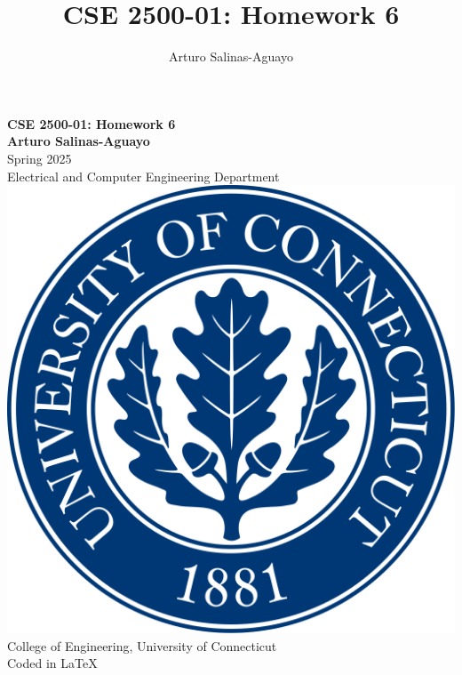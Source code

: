 \documentclass[12pt]{article}
\author{Arturo Salinas-Aguayo}
\title{CSE 2500-01: Homework 6}
\begin{document}
\newcommand{\closure}[2][3]{%
	{}\mkern#1mu\overline{\mkern-#1mu#2}}
\newcommand\ncoverline[1]{\mkern1mu\overline{\mkern-1mu#1\mkern-1mu}\mkern1mu}
\begin{titlepage}
	\centering
	\vspace*{3cm}
	\huge\textbf{CSE 2500-01: Homework 6}\\
	\vspace{5cm}
	\Large\textbf{Arturo Salinas-Aguayo}\\
	\normalsize
	Spring 2025\\
	Electrical and Computer Engineering Department\\
	\vfill
	\includegraphics[scale=0.1]{uconnlogo}\\
	College of Engineering, University of Connecticut\\
	\scriptsize{Coded in \LaTeX}
	\vspace*{1cm}
\end{titlepage}
\end{document}
